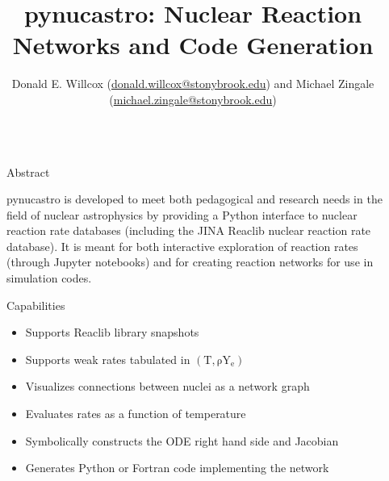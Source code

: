 \documentclass[final]{beamer}
\title{pynucastro: Nuclear Reaction Networks and Code Generation} %
\author{Donald E. Willcox (\href{mailto:donald.willcox@stonybrook.edu}{donald.willcox@stonybrook.edu}) and Michael Zingale (\href{mailto:michael.zingale@stonybrook.edu}{michael.zingale@stonybrook.edu})} %
\institute{Department of Physics and Astronomy, Stony Brook University} %
\newlength{\sepwid}
\newlength{\onecolwid}
\begin{document}

\setlength{\belowcaptionskip}{2ex} %
\setlength\belowdisplayshortskip{2ex} %

\begin{frame}[t] %

\begin{columns}[t] %

\begin{column}{\sepwid}\end{column} %

\begin{column}{\onecolwid} %

\begin{alertblock}{Abstract}

  pynucastro is developed to meet both pedagogical and research needs
  in the field of nuclear astrophysics by providing a Python interface
  to nuclear reaction rate databases (including the JINA Reaclib
  nuclear reaction rate database). It is meant for both interactive
  exploration of reaction rates (through Jupyter notebooks) and for
  creating reaction networks for use in simulation codes.

\end{alertblock}

\begin{block}{Capabilities}

\begin{itemize}
\item Supports Reaclib library snapshots
\item Supports weak rates tabulated in $\mathrm{(T, \rho Y_e)}$
\item Visualizes connections between nuclei as a network graph
\item Evaluates rates as a function of temperature
\item Symbolically constructs the ODE right hand side and Jacobian
\item Generates Python or Fortran code implementing the network
\end{itemize}


\end{block}
\end{column}
\end{columns}
\end{frame}
\end{document}

